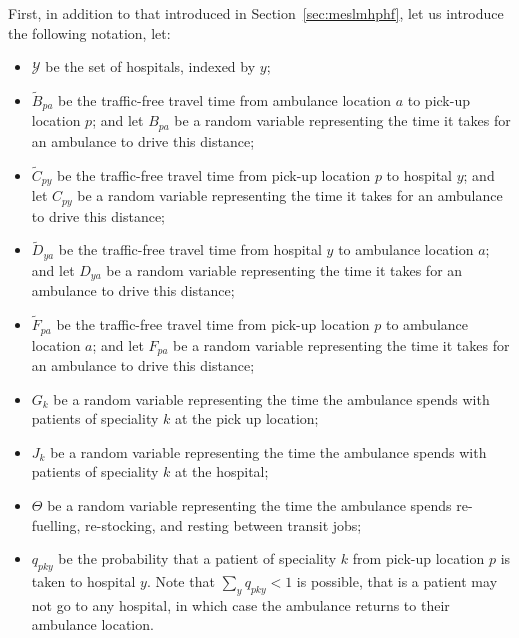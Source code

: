 \documentclass[preprint,12pt]{elsarticle}
\begin{document}
First, in addition to that introduced in Section~\ref{sec:meslmhphf}, let us
introduce the following notation, let:

\begin{itemize}
  \item $\mathcal{Y}$ be the set of hospitals, indexed by $y$;
  \item $\tilde{B}_{pa}$ be the traffic-free travel time from ambulance
        location $a$ to pick-up location $p$; and let $B_{pa}$ be a random
        variable representing the time it takes for an ambulance to drive this
        distance;
  \item $\tilde{C}_{py}$ be the traffic-free travel time from pick-up location
        $p$ to hospital $y$; and let $C_{py}$ be a random variable
        representing the time it takes for an ambulance to drive this
        distance;
  \item $\tilde{D}_{ya}$ be the traffic-free travel time from hospital $y$ to
        ambulance location $a$; and let $D_{ya}$ be a random variable
        representing the time it takes for an ambulance to drive this distance;
  \item $\tilde{F}_{pa}$ be the traffic-free travel time from pick-up location
        $p$ to ambulance location $a$; and let $F_{pa}$ be a random variable
        representing the time it takes for an ambulance to drive this distance;
  \item $G_k$ be a random variable representing the time the ambulance spends
        with patients of speciality $k$ at the pick up location;
  \item $J_k$ be a random variable representing the time the ambulance spends
        with patients of speciality $k$ at the hospital;
  \item $\Theta$ be a random variable representing the time the ambulance spends
        re-fuelling, re-stocking, and resting between transit jobs;
  \item $q_{pky}$ be the probability that a patient of speciality $k$ from
        pick-up location $p$ is taken to hospital $y$.
        Note that $\sum_y q_{pky} < 1$ is possible, that is a patient may not
        go to any hospital, in which case the ambulance returns to their
        ambulance location.
\end{itemize}
\end{document}
